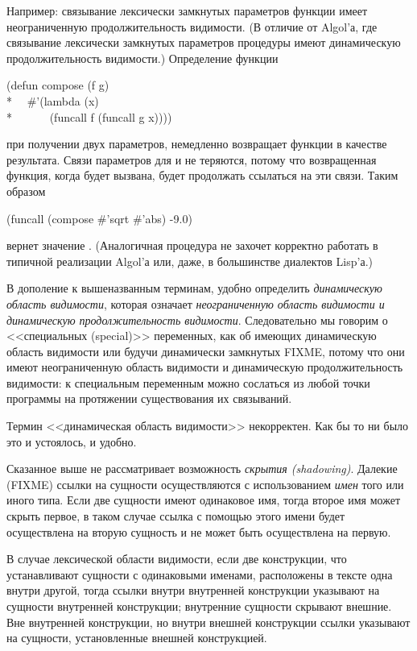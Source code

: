 \begin{itemize}
Например: связывание лексически замкнутых параметров функции имеет неограниченную
продолжительность видимости. (В отличие от Algol'а, где связывание лексически
замкнутых параметров процедуры имеют динамическую продолжительность видимости.)
Определение функции
\begin{lisp}
(defun compose (f g) \\*
~~\#'(lambda (x) \\*
~~~~~~(funcall f (funcall g x))))
\end{lisp}
при получении двух параметров, немедленно возвращает функции в качестве
результата.
Связи параметров для  и  не теряются, потому что возвращенная
функция, когда будет вызвана, будет продолжать ссылаться на эти связи.
Таким образом
\begin{lisp}
(funcall (compose \#'sqrt \#'abs) -9.0)
\end{lisp}
вернет значение . (Аналогичная процедура не захочет корректно работать в
типичной реализации Algol'а или, даже, в большинстве диалектов Lisp'а.)
\end{itemize}

В дополение к вышеназванным терминам, удобно определить \emph{динамическую
  область видимости}, которая означает \emph{неограниченную область видимости и
  динамическую продолжительность видимости}. Следовательно мы говорим о
<<специальных (special)>> переменных, как об имеющих динамическую область
видимости или будучи динамически замкнутых FIXME, потому что они имеют
неограниченную область видимости и динамическую продолжительность видимости:
к специальным переменным можно сослаться из любой точки программы на протяжении
существования их связываний.

\begin{newer}
Термин <<динамическая область видимости>> некорректен. Как бы то ни было это и
устоялось, и удобно.
\end{newer}

Сказанное выше не рассматривает возможность \emph{скрытия
  (shadowing)}. Далекие (FIXME) ссылки на сущности осуществляются с
использованием \emph{имен} того или иного типа. Если две сущности имеют
одинаковое имя, тогда второе имя может скрыть первое, в таком случае ссылка с
помощью этого имени будет осуществлена на вторую сущность и не может быть
осуществлена на первую.

В случае лексической области видимости,
если две конструкции, что устанавливают сущности с одинаковыми именами,
расположены в тексте одна внутри другой, тогда ссылки внутри внутренней
конструкции указывают на сущности внутренней конструкции; внутренние сущности
скрывают внешние. Вне внутренней конструкции, но внутри внешней конструкции
ссылки указывают на сущности, установленные внешней конструкцией.


